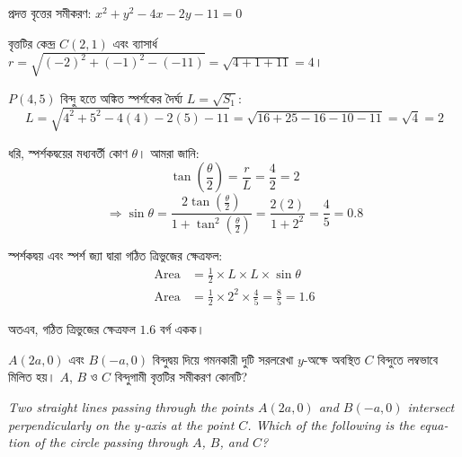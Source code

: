 \documentclass[12pt, a4paper]{article}
\begin{document}
\begin{tcolorbox}[solutionbox={সমাধান (Solution)}]
    \noindent
    প্রদত্ত বৃত্তের সমীকরণ: $x^2 + y^2 - 4x - 2y - 11 = 0$
    
    \vspace{0.5em}
    বৃত্তটির কেন্দ্র $C(2, 1)$ এবং ব্যাসার্ধ $r = \sqrt{(-2)^2 + (-1)^2 - (-11)} = \sqrt{4 + 1 + 11} = 4$।
    
    \vspace{0.5em}
    $P(4, 5)$ বিন্দু হতে অঙ্কিত স্পর্শকের দৈর্ঘ্য $L = \sqrt{S_1}$:
    \[ L = \sqrt{4^2 + 5^2 - 4(4) - 2(5) - 11} = \sqrt{16 + 25 - 16 - 10 - 11} = \sqrt{4} = 2 \]
    
    \vspace{0.5em}
    ধরি, স্পর্শকদ্বয়ের মধ্যবর্তী কোণ $\theta$। আমরা জানি:
    \[ \tan\left(\frac{\theta}{2}\right) = \frac{r}{L} = \frac{4}{2} = 2 \]
    \[ \Rightarrow \sin\theta = \frac{2\tan\left(\frac{\theta}{2}\right)}{1 + \tan^2\left(\frac{\theta}{2}\right)} = \frac{2(2)}{1 + 2^2} = \frac{4}{5} = 0.8 \]
    
    \vspace{0.5em}
    স্পর্শকদ্বয় এবং স্পর্শ জ্যা দ্বারা গঠিত ত্রিভুজের ক্ষেত্রফল:
    \begin{align*}
        \text{Area} &= \frac{1}{2} \times L \times L \times \sin\theta \\
        \text{Area} &= \frac{1}{2} \times 2^2 \times \frac{4}{5} = \frac{8}{5} = 1.6
    \end{align*}
    
    \vspace{0.5em}
    অতএব, গঠিত ত্রিভুজের ক্ষেত্রফল $1.6$ বর্গ একক।
\end{tcolorbox}

\vspace{2em}

\begin{tcolorbox}[questionbox={প্রশ্ন (Question) 2}]
    \noindent
    $A(2a, 0)$ এবং $B(-a, 0)$ বিন্দুদ্বয় দিয়ে গমনকারী দুটি সরলরেখা $y$-অক্ষে অবস্থিত $C$ বিন্দুতে লম্বভাবে মিলিত হয়। $A$, $B$ ও $C$ বিন্দুগামী বৃত্তটির সমীকরণ কোনটি?
    
    \vspace{0.8em}
    \begin{english}
    \noindent\textit{\color{darkgray}
    Two straight lines passing through the points $A(2a, 0)$ and $B(-a, 0)$ intersect perpendicularly on the $y$-axis at the point $C$. Which of the following is the equation of the circle passing through $A$, $B$, and $C$?
    }
    \end{english}
\end{tcolorbox}
\end{document}
